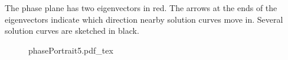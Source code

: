 \documentclass[11pt, titlepage]{article}
\begin{document}
\begin{enumerate}
\begin{solution}
            The phase plane has two eigenvectors in red.
            The arrows at the ends of the eigenvectors indicate which direction nearby solution curves move in.
            Several solution curves are sketched in black.
            \begin{figure}[H]
                \centering
                \def\svgwidth{0.8\columnwidth}
                {phasePortrait5.pdf_tex}
            \end{figure}
        \end{solution}
    \end{enumerate}
\end{document}
